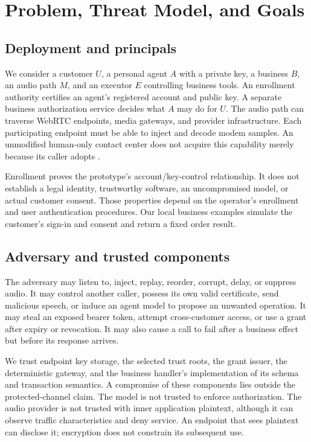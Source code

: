 \section{Problem, Threat Model, and Goals}
\label{sec:model}
\subsection{Deployment and principals}
We consider a customer $U$, a personal agent $A$ with a private key, a business
$B$, an audio path $M$, and an executor $E$ controlling business tools. An
enrollment authority certifies an agent's registered account and public key.
A separate business authorization service decides what $A$ may do for $U$.
The audio path can traverse WebRTC endpoints, media gateways, and provider
infrastructure. Each participating endpoint must be able to inject and decode
modem samples. An unmodified human-only contact center does not acquire this
capability merely because its caller adopts \sys{}.

Enrollment proves the prototype's account/key-control relationship. It does not
establish a legal identity, trustworthy software, an uncompromised model, or
actual customer consent. Those properties depend on the operator's enrollment
and user authentication procedures. Our local business examples simulate the
customer's sign-in and consent and return a fixed order result.

\subsection{Adversary and trusted components}
The adversary may listen to, inject, replay, reorder, corrupt, delay, or suppress
audio. It may control another caller, possess its own valid certificate, send
malicious speech, or induce an agent model to propose an unwanted operation.
It may steal an exposed bearer token, attempt cross-customer access, or use a
grant after expiry or revocation. It may also cause a call to fail after a
business effect but before its response arrives.

We trust endpoint key storage, the selected trust roots, the grant issuer,
the deterministic gateway, and the business handler's implementation of its
schema and transaction semantics. A compromise of these components lies outside
the protected-channel claim. The model is not trusted to enforce authorization.
The audio provider is not trusted with inner application plaintext, although it
can observe traffic characteristics and deny service. An endpoint that sees
plaintext can disclose it; encryption does not constrain its subsequent use.

